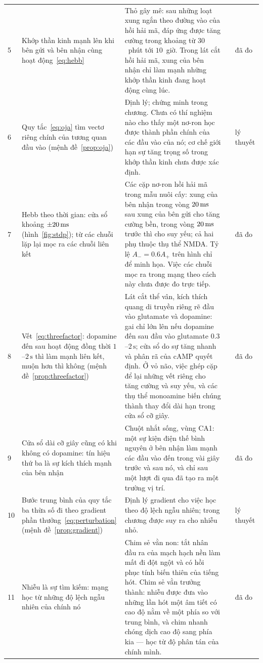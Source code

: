 {\begin{longtable}{>{\raggedright}p{0.5cm}>{\raggedright}p{4.0cm}>{\raggedright}p{5.6cm}>{\raggedright}p{2.3cm}>{\raggedright\arraybackslash}p{1.7cm}}
5 & Khớp thần kinh mạnh lên khi bên gửi và bên nhận cùng hoạt động~\eqref{eq:hebb} & Thỏ gây mê: sau những loạt xung ngắn theo đường vào của hồi hải mã, đáp ứng được tăng cường trong khoảng từ $30$~phút tới $10$~giờ. Trong lát cắt hồi hải mã, xung của bên nhận chỉ làm mạnh những khớp thần kinh đang hoạt động cùng lúc. & \cite{Bliss1973LTP, Kelso1986hebb} & đã đo \\
6 & Quy tắc~\eqref{eq:oja} tìm vectơ riêng chính của tương quan đầu vào (mệnh đề~\ref{prop:oja}) & Định lý; chứng minh trong chương. Chưa có thí nghiệm nào cho thấy một nơ-ron học được thành phần chính của các đầu vào của nó; cơ chế giới hạn sự tăng trọng số trong khớp thần kinh chưa được xác định. & \cite{Oja1982} & lý thuyết \\
7 & Hebb theo thời gian: cửa sổ khoảng $\pm20\,\text{ms}$ (hình~\ref{fig:stdp}); từ các chuỗi lặp lại mọc ra các chuỗi liên kết & Các cặp nơ-ron hồi hải mã trong mẫu nuôi cấy: xung của bên nhận trong vòng $20\,\text{ms}$ sau xung của bên gửi cho tăng cường bền, trong vòng $20\,\text{ms}$ trước thì cho suy yếu; cả hai phụ thuộc thụ thể NMDA. Tỷ lệ $A_-=0.6A_+$ trên hình chỉ để minh họa. Việc các chuỗi mọc ra trong mạng theo cách này chưa được đo trực tiếp. & \cite{BiPoo1998} & đã đo \\
8 & Vết~\eqref{eq:threefactor}: dopamine đến sau hoạt động đồng thời $1$--$2\,\text{s}$ thì làm mạnh liên kết, muộn hơn thì không (mệnh đề~\ref{prop:threefactor}) & Lát cắt thể vân, kích thích quang di truyền riêng rẽ đầu vào glutamate và dopamine: gai chỉ lớn lên nếu dopamine đến sau đầu vào glutamate $0.3$--$2\,\text{s}$; cửa sổ do sự tăng nhanh và phân rã của cAMP quyết định. Ở vỏ não, việc ghép cặp để lại những vết riêng cho tăng cường và suy yếu, và các thụ thể monoamine biến chúng thành thay đổi dài hạn trong cửa sổ cỡ giây. & \cite{Yagishita2014, He2015eligibility} & đã đo \\
9 & Cửa sổ dài cỡ giây cũng có khi không có dopamine: tín hiệu thứ ba là sự kích thích mạnh của bên nhận & Chuột nhắt sống, vùng CA1: một sự kiện điện thế bình nguyên ở bên nhận làm mạnh các đầu vào đến trong vài giây trước và sau nó, và chỉ sau một lượt đi qua đã tạo ra một trường vị trí. & \cite{Bittner2017} & đã đo \\
10 & Bước trung bình của quy tắc ba thừa số đi theo gradient phần thưởng~\eqref{eq:perturbation} (mệnh đề~\ref{prop:gradient}) & Định lý gradient cho việc học theo độ lệch ngẫu nhiên; trong chương được suy ra cho nhiễu nhỏ. & \cite{Williams1992} & lý thuyết \\
11 & Nhiễu là sự tìm kiếm: mạng học từ những độ lệch ngẫu nhiên của chính nó & Chim sẻ vằn non: tắt nhân đầu ra của mạch hạch nền làm mất đi đột ngột và có hồi phục tính biến thiên của tiếng hót. Chim sẻ vằn trưởng thành: nhiễu được đưa vào những lần hót một âm tiết có cao độ nằm về một phía so với trung bình, và chim nhanh chóng dịch cao độ sang phía kia --- học từ độ phân tán của chính mình. & \cite{Olveczky2005, TumerBrainard2007} & đã đo \\

\end{longtable}}
